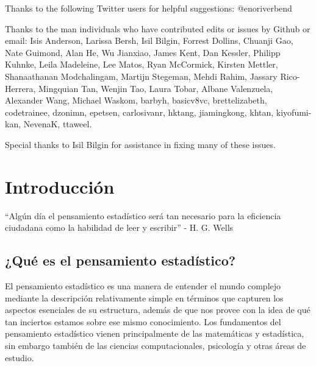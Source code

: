 \documentclass[
  12pt,
]{book}
\begin{document}
Thanks to the following Twitter users for helpful suggestions: @enoriverbend

Thanks to the man individuals who have contributed edits or issues by Github or email:
Isis Anderson, Larissa Bersh, Isil Bilgin, Forrest Dollins, Chuanji Gao, Nate Guimond, Alan He, Wu Jianxiao, James Kent, Dan Kessler, Philipp Kuhnke, Leila Madeleine, Lee Matos, Ryan McCormick, Kirsten Mettler, Shanaathanan Modchalingam, Martijn Stegeman, Mehdi Rahim, Jassary Rico-Herrera, Mingquian Tan, Wenjin Tao, Laura Tobar, Albane Valenzuela, Alexander Wang, Michael Waskom,
barbyh, basicv8vc, brettelizabeth, codetrainee, dzonimn, epetsen, carlosivanr, hktang, jiamingkong, khtan, kiyofumi-kan, NevenaK, ttaweel.

Special thanks to Isil Bilgin for assistance in fixing many of these issues.

\hypertarget{introducciuxf3n}{%
\chapter{Introducción}\label{introducciuxf3n}}

``Algún día el pensamiento estadístico será tan necesario para la eficiencia ciudadana como la habilidad de leer y escribir'' - H. G. Wells

\hypertarget{quuxe9-es-el-pensamiento-estaduxedstico}{%
\section{¿Qué es el pensamiento estadístico?}\label{quuxe9-es-el-pensamiento-estaduxedstico}}

El pensamiento estadístico es una manera de entender el mundo complejo mediante la descripción relativamente simple en términos que capturen los aspectos esenciales de su estructura, además de que nos provee con la idea de qué tan inciertos estamos sobre ese mismo conocimiento. Los fundamentos del pensamiento estadístico vienen principalmente de las matemáticas y estadística, sin embargo también de las ciencias computacionales, psicología y otras áreas de estudio.
\end{document}
